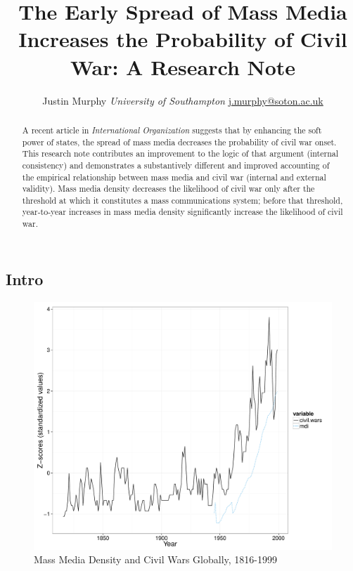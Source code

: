 \documentclass[11pt,article,oneside]{memoir}
\title{The Early Spread of Mass Media Increases the Probability of Civil War: A
Research Note}
\author{\Large Justin Murphy\vspace{0.05in} \newline\normalsize\emph{University of Southampton} \newline\footnotesize \url{j.murphy@soton.ac.uk}\vspace*{0.2in}\newline }
\date{}
\makeatletter
\def\maxwidth{\ifdim\Gin@nat@width>\linewidth\linewidth
\else\Gin@nat@width\fi}
\let\Oldincludegraphics\includegraphics
\renewcommand{\includegraphics}[1]{\Oldincludegraphics[width=\maxwidth]{#1}}
\makeatother
\begin{document}
  
\setsansfont[Mapping=tex-text]{Gill Sans} 
\setmonofont[Mapping=tex-text,Scale=0.8]{Consolas}
\pagestyle{kjh}

\singlespacing


\maketitle



\vspace{-4ex}
\begin{abstract}

\noindent A recent article in \emph{International Organization} suggests that by
enhancing the soft power of states, the spread of mass media decreases
the probability of civil war onset. This research note contributes an
improvement to the logic of that argument (internal consistency) and
demonstrates a substantively different and improved accounting of the
empirical relationship between mass media and civil war (internal and
external validity). Mass media density decreases the likelihood of civil
war only after the threshold at which it constitutes a mass
communications system; before that threshold, year-to-year increases in
mass media density significantly increase the likelihood of civil war.

\end{abstract}

\newpage


\onehalfspacing

\subsection{Intro}\label{intro}

\begin{figure}[htbp]
\centering
\includegraphics{figure/globalplot.pdf}
\caption{Mass Media Density and Civil Wars Globally, 1816-1999}
\end{figure}
\end{document}
